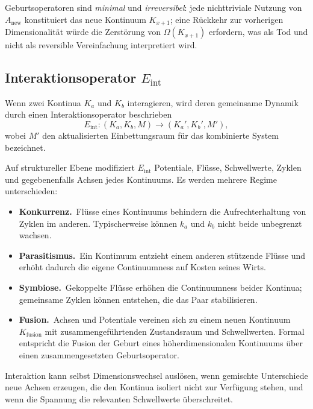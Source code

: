 Geburtsoperatoren sind \emph{minimal} und \emph{irreversibel}:
jede nichttriviale Nutzung von \(A_{\mathrm{new}}\) konstituiert das neue
Kontinuum \(K_{x+1}\); eine Rückkehr zur vorherigen Dimensionalität würde die
Zerstörung von \(\Omega(K_{x+1})\) erfordern, was als Tod und nicht als
reversible Vereinfachung interpretiert wird.

\subsection{Interaktionsoperator \texorpdfstring{$E_{\mathrm{int}}$}{E\_int}}

Wenn zwei Kontinua \(K_a\) und \(K_b\) interagieren, wird deren gemeinsame
Dynamik durch einen Interaktionsoperator beschrieben
\[
  E_{\mathrm{int}} : (K_a, K_b, M)
    \longrightarrow (K_a', K_b', M'),
\]
wobei \(M'\) den aktualisierten Einbettungsraum für das kombinierte System
bezeichnet.

Auf struktureller Ebene modifiziert \(E_{\mathrm{int}}\) Potentiale, Flüsse,
Schwellwerte, Zyklen und gegebenenfalls Achsen jedes Kontinuums. Es werden
mehrere Regime unterschieden:

\begin{itemize}
  \item \textbf{Konkurrenz.}\
        Flüsse eines Kontinuums behindern die Aufrechterhaltung von Zyklen im
        anderen. Typischerweise können \(k_a\) und \(k_b\) nicht beide unbegrenzt
        wachsen.
  \item \textbf{Parasitismus.}\
        Ein Kontinuum entzieht einem anderen stützende Flüsse und erhöht dadurch
        die eigene Continuumness auf Kosten seines Wirts.
  \item \textbf{Symbiose.}\
        Gekoppelte Flüsse erhöhen die Continuumness beider Kontinua; gemeinsame
        Zyklen können entstehen, die das Paar stabilisieren.
  \item \textbf{Fusion.}\
        Achsen und Potentiale vereinen sich zu einem neuen Kontinuum
        \(K_{\mathrm{fusion}}\) mit zusammengeführtenden Zustandsraum und
        Schwellwerten. Formal entspricht die Fusion der Geburt eines
        höherdimensionalen Kontinuums über einen zusammengesetzten Geburtsoperator.
\end{itemize}

Interaktion kann selbst Dimensionswechsel auslösen, wenn gemischte Unterschiede
neue Achsen erzeugen, die den Kontinua isoliert nicht zur Verfügung stehen, und
wenn die Spannung die relevanten Schwellwerte überschreitet.

